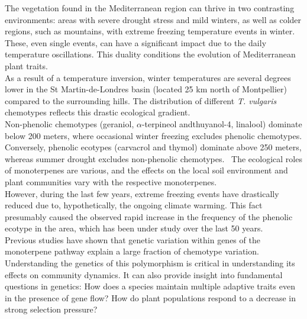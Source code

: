 The vegetation found in the Mediterranean region can thrive in two contrasting environments: areas with severe drought stress and mild winters, as well as colder regions, such as mountains, with extreme freezing temperature events in winter. These, even single events, can have a significant impact due to the daily temperature oscillations. This duality conditions the evolution of Mediterranean plant traits.~\cite{thompsonPlantTraitsEcological2020}\\

As a result of a temperature inversion, winter temperatures are several degrees lower in the St Martin-de-Londres basin (located 25 km north of Montpellier) compared to the surrounding hills. The distribution of different \textit{T. vulgaris} chemotypes reflects this drastic ecological gradient.~\cite{thompsonPlantTraitsEcological2020,bataillonGenotypePhenotypeGenetic2022} \\

Non-phenolic chemotypes (geraniol, $\alpha$-terpineol andthuyanol-4, linalool) dominate below 200 meters, where occasional winter freezing excludes phenolic chemotypes. Conversely, phenolic ecotypes (carvacrol and thymol) dominate above 250 meters, whereas summer drought excludes non-phenolic chemotypes.~\cite{thompsonPlantTraitsEcological2020} The ecological roles of monoterpenes are various, and the effects on the local soil environment and plant communities vary with the respective monoterpenes.~\cite{bataillonGenotypePhenotypeGenetic2022} \\

However, during the last few years, extreme freezing events have drastically reduced due to, hypothetically, the ongoing climate warming. This fact presumably caused the observed rapid increase in the frequency of the phenolic ecotype in the area, which has been under study over the last 50 years.~\cite{thompsonPlantTraitsEcological2020,bataillonGenotypePhenotypeGenetic2022} \\

Previous studies have shown that genetic variation within genes of the monoterpene pathway explain a large fraction of chemotype variation. ~\cite{bataillonGenotypePhenotypeGenetic2022} Understanding the genetics of this polymorphism is critical in understanding its effects on community dynamics. It can also provide insight into fundamental questions in genetics: How does a species maintain multiple adaptive traits even in the presence of gene flow? How do plant populations respond to a decrease in strong selection pressure?~\cite{bataillonGenotypePhenotypeGenetic2022, thompsonPlantTraitsEcological2020}\\

